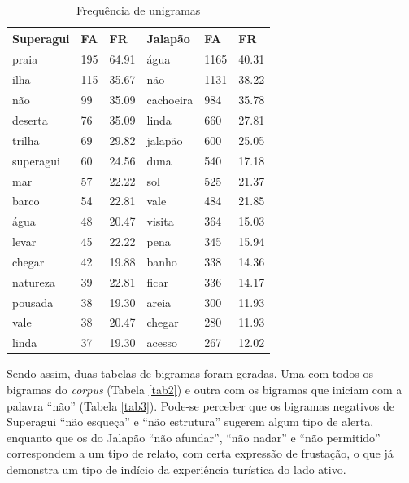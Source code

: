 \documentclass[preprint, 3p,
authoryear]{elsarticle} %
\begin{document}
\begin{table}

\caption{\label{tab:tab1}\label{tab1}Frequência de unigramas}
\centering
\begin{tabular}[t]{llllll}
\toprule
\textbf{Superagui} & \textbf{FA} & \textbf{FR} & \textbf{Jalapão} & \textbf{FA} & \textbf{FR}\\
\midrule
praia & 195 & 64.91 & água & 1165 & 40.31\\
ilha & 115 & 35.67 & não & 1131 & 38.22\\
não & 99 & 35.09 & cachoeira & 984 & 35.78\\
deserta & 76 & 35.09 & linda & 660 & 27.81\\
trilha & 69 & 29.82 & jalapão & 600 & 25.05\\
\addlinespace
superagui & 60 & 24.56 & duna & 540 & 17.18\\
mar & 57 & 22.22 & sol & 525 & 21.37\\
barco & 54 & 22.81 & vale & 484 & 21.85\\
água & 48 & 20.47 & visita & 364 & 15.03\\
levar & 45 & 22.22 & pena & 345 & 15.94\\
\addlinespace
chegar & 42 & 19.88 & banho & 338 & 14.36\\
natureza & 39 & 22.81 & ficar & 336 & 14.17\\
pousada & 38 & 19.30 & areia & 300 & 11.93\\
vale & 38 & 20.47 & chegar & 280 & 11.93\\
linda & 37 & 19.30 & acesso & 267 & 12.02\\
\bottomrule
\end{tabular}
\end{table}

Sendo assim, duas tabelas de bigramas foram geradas. Uma com todos os
bigramas do \emph{corpus} (Tabela \ref{tab2}) e outra com os bigramas
que iniciam com a palavra ``não'' (Tabela \ref{tab3}). Pode-se perceber
que os bigramas negativos de Superagui ``não esqueça'' e ``não
estrutura'' sugerem algum tipo de alerta, enquanto que os do Jalapão
``não afundar'', ``não nadar'' e ``não permitido'' correspondem a um
tipo de relato, com certa expressão de frustação, o que já demonstra um
tipo de indício da experiência turística do lado ativo.
\end{document}
